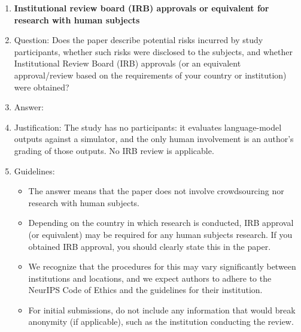 \begin{enumerate}
\item {\bf Institutional review board (IRB) approvals or equivalent for research with human subjects}
    \item[] Question: Does the paper describe potential risks incurred by study participants, whether such risks were disclosed to the subjects, and whether Institutional Review Board (IRB) approvals (or an equivalent approval/review based on the requirements of your country or institution) were obtained?
    \item[] Answer: \answerNA{}
    \item[] Justification: The study has no participants: it evaluates language-model outputs against a simulator, and the only human involvement is an author's grading of those outputs. No IRB review is applicable.
    \item[] Guidelines:
    \begin{itemize}
        \item The answer \answerNA{} means that the paper does not involve crowdsourcing nor research with human subjects.
        \item Depending on the country in which research is conducted, IRB approval (or equivalent) may be required for any human subjects research. If you obtained IRB approval, you should clearly state this in the paper. 
        \item We recognize that the procedures for this may vary significantly between institutions and locations, and we expect authors to adhere to the NeurIPS Code of Ethics and the guidelines for their institution. 
        \item For initial submissions, do not include any information that would break anonymity (if applicable), such as the institution conducting the review.
    \end{itemize}


\end{enumerate}
